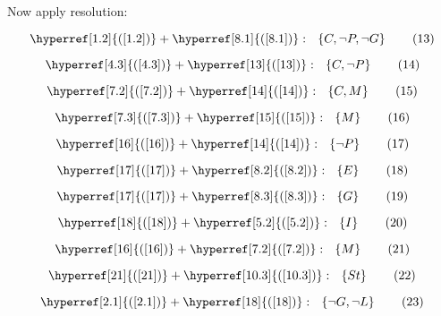 \documentclass[a4paper]{article}
\newcommand{\refequation}[1]{\hyperref[#1]{(\ref{#1})}}
\begin{document}
Now apply resolution:

\begin{equation}
\refequation{1.2} + \refequation{8.1}: \  \ \left\{ C , \lnot P , \lnot G \right\} \tag{13} \label{13}
\end{equation}

\begin{equation}
\refequation{4.3} + \refequation{13}: \  \ \left\{ C , \lnot P \right\} \tag{14} \label{14}
\end{equation}

\begin{equation}
\refequation{7.2} + \refequation{14}: \  \ \left\{ C , M \right\} \tag{15} \label{15}
\end{equation}

\begin{equation}
\refequation{7.3} + \refequation{15}: \  \ \left\{ M \right\} \tag{16} \label{16}
\end{equation}

\begin{equation}
\refequation{16} + \refequation{14}: \  \ \left\{ \lnot P\right\} \tag{17} \label{17}
\end{equation}

\begin{equation}
\refequation{17} + \refequation{8.2}: \  \ \left\{ E \right\} \tag{18} \label{18}
\end{equation}

\begin{equation}
\refequation{17} + \refequation{8.3}: \  \ \left\{ G \right\} \tag{19} \label{19}
\end{equation}

\begin{equation}
\refequation{18} + \refequation{5.2}: \  \ \left\{ I \right\} \tag{20} \label{20}
\end{equation}

\begin{equation}
\refequation{16} + \refequation{7.2}: \  \ \left\{ M \right\} \tag{21} \label{21}
\end{equation}

\begin{equation}
\refequation{21} + \refequation{10.3}: \  \ \left\{ St \right\} \tag{22} \label{22}
\end{equation}

\begin{equation}
\refequation{2.1} + \refequation{18}: \  \ \left\{ \lnot G , \lnot L \right\} \tag{23} \label{23}
\end{equation}
\end{document}
